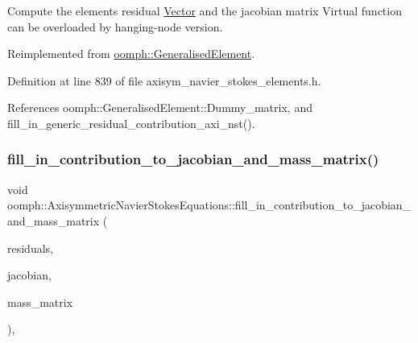 Compute the element\textquotesingle{}s residual \hyperlink{classoomph_1_1Vector}{Vector} and the jacobian matrix Virtual function can be overloaded by hanging-\/node version. 



Reimplemented from \hyperlink{classoomph_1_1GeneralisedElement_a6ae09fc0d68e4309ac1b03583d252845}{oomph\+::\+Generalised\+Element}.



Definition at line 839 of file axisym\+\_\+navier\+\_\+stokes\+\_\+elements.\+h.



References oomph\+::\+Generalised\+Element\+::\+Dummy\+\_\+matrix, and fill\+\_\+in\+\_\+generic\+\_\+residual\+\_\+contribution\+\_\+axi\+\_\+nst().

\mbox{\label{classoomph_1_1AxisymmetricNavierStokesEquations_ab56a4ee5ee2ffcee5499560ea1b323bc}} 
\subsubsection{\texorpdfstring{fill\+\_\+in\+\_\+contribution\+\_\+to\+\_\+jacobian\+\_\+and\+\_\+mass\+\_\+matrix()}{fill\_in\_contribution\_to\_jacobian\_and\_mass\_matrix()}}
{\footnotesize\ttfamily void oomph\+::\+Axisymmetric\+Navier\+Stokes\+Equations\+::fill\+\_\+in\+\_\+contribution\+\_\+to\+\_\+jacobian\+\_\+and\+\_\+mass\+\_\+matrix (\begin{DoxyParamCaption}\item[{\hyperlink{classoomph_1_1Vector}{Vector}$<$ double $>$ \&}]{residuals,  }\item[{\hyperlink{classoomph_1_1DenseMatrix}{Dense\+Matrix}$<$ double $>$ \&}]{jacobian,  }\item[{\hyperlink{classoomph_1_1DenseMatrix}{Dense\+Matrix}$<$ double $>$ \&}]{mass\+\_\+matrix }\end{DoxyParamCaption})\hspace{0.3cm}{\ttfamily [inline]}, {\ttfamily [virtual]}}

